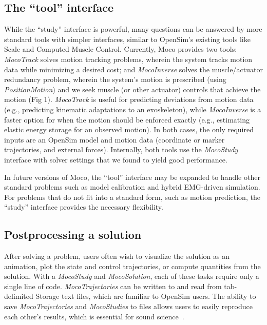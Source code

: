 \documentclass[10pt,letterpaper]{article}
\begin{document}
\subsection*{The “tool” interface}

While the “study” interface is powerful, many questions can be answered by more standard tools with simpler interfaces, similar to OpenSim’s existing tools like Scale and Computed Muscle Control. Currently, Moco provides two tools: \textit{MocoTrack} solves motion tracking problems, wherein the system tracks motion data while minimizing a desired cost; and \textit{MocoInverse} solves the muscle/actuator redundancy problem, wherein the system’s motion is prescribed (using \textit{PositionMotion}) and we seek muscle (or other actuator) controls that achieve the motion (Fig 1). \textit{MocoTrack} is useful for predicting deviations from motion data (e.g., predicting kinematic adaptations to an exoskeleton), while \textit{MocoInverse} is a faster option for when the motion should be enforced exactly (e.g., estimating elastic energy storage for an observed motion). In both cases, the only required inputs are an OpenSim model and motion data (coordinate or marker trajectories, and external forces). Internally, both tools use the \textit{MocoStudy} interface with solver settings that we found to yield good performance.

In future versions of Moco, the “tool” interface may be expanded to handle other standard problems such as model calibration and hybrid EMG-driven simulation. For problems that do not fit into a standard form, such as motion prediction, the “study” interface provides the necessary flexibility.

\subsection*{Postprocessing a solution}

After solving a problem, users often wish to visualize the solution as an animation, plot the state and control trajectories, or compute quantities from the solution. With a \textit{MocoStudy} and \textit{MocoSolution}, each of these tasks require only a single line of code. \textit{MocoTrajectories} can be written to and read from tab-delimited Storage text files, which are familiar to OpenSim users. The ability to save \textit{MocoTrajectories} and \textit{MocoStudies} to files allows users to easily reproduce each other’s results, which is essential for sound science~\cite{Peng:2011}.
\end{document}
